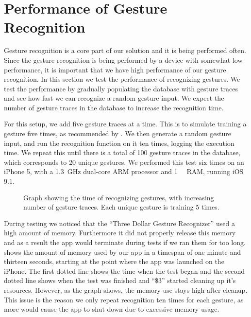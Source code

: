 \section{Performance of Gesture Recognition}\label{sec:gestureperformance}
Gesture recognition is a core part of our solution and it is being performed often. 
Since the gesture recognition is being performed by a device with somewhat low performance,
it is important that we have high performance of our gesture recognition. 
In this section we test the performance of recognizing gestures. 
We test the performance by gradually populating the database with gesture traces and see how fast we can recognize a random gesture input.
We expect the number of gesture traces in the database to increase the recognition time.

For this setup, we add five gesture traces at a time. 
This is to simulate training a gesture five times, 
as recommended by \cite{threedollar}. 
We then generate a random gesture input, 
and run the recognition function on it ten times, 
logging the execution time.
We repeat this until there is a total of \num{100} gesture traces in the database, 
which corresponds to \num{20} unique gestures.
We performed this test six times on an iPhone 5, 
with a \SI{1.3}{\giga\hertz} dual-core ARM processor and \SI{1}{\giga\byte} RAM, running iOS \num{9.1}.

\begin{figure}[!htb]
    \centering
    
    \caption{Graph showing the time of recognizing gestures, with increasing number of gesture traces. Each unique gesture is training \num{5} times.}
    \label{fig:performancegraph}
\end{figure}

During testing we noticed that the ``Three Dollar Gesture Recognizer'' used a high amount of memory. Furthermore it did not properly release this memory and as a result the app would terminate during tests if we ran them for too long.
 shows the amount of memory used by our app in a timespan of one minute and thirteen seconds, starting at the point where the app was launched on the iPhone. 
The first dotted line shows the time when the test began and the second dotted line shows when the test was finished and ``\$3'' started cleaning up it's resources.
However, as the graph shows, the memory use stays high after cleanup.
This issue is the reason we only repeat recognition ten times for each gesture, as more would cause the app to shut down due to excessive memory usage.

